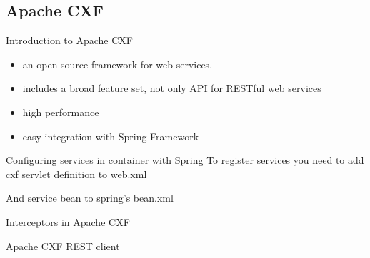\subsection{Apache CXF}
	\begin{frame}{Introduction to Apache CXF}
		\begin{itemize}
		  \item an open-source framework for web services.
		  \item includes a broad feature set, not only API for RESTful web services
		  \item high performance
		  \item easy integration with Spring Framework
		\end{itemize}	
	\end{frame}
	
	\begin{frame}{Configuring services in container with Spring}
		To register services you need to add cxf servlet definition to web.xml
		
		And service bean to spring's bean.xml
		
	\end{frame}
	
	\begin{frame}{Interceptors in Apache CXF}

	\end{frame}
	
	\begin{frame}{Apache CXF REST client}

	\end{frame}

